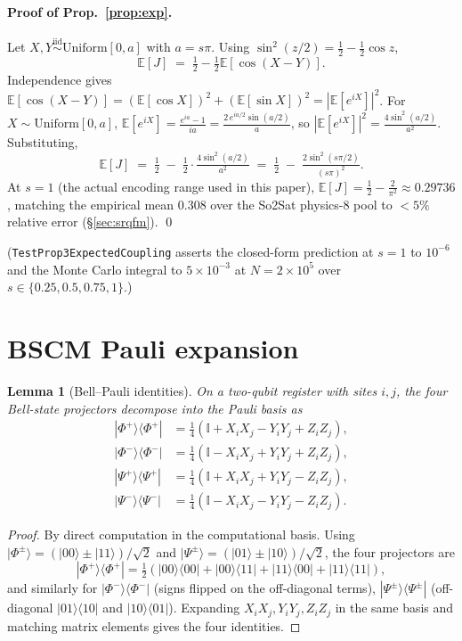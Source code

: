 \documentclass[pdflatex,sn-mathphys]{sn-jnl}
\theoremstyle{plain}
\newtheorem{lemma}{Lemma}
\theoremstyle{remark}
\theoremstyle{definition}
\begin{document}
\paragraph{Proof of Prop.~\ref{prop:exp}.}
Let $X, Y \stackrel{\mathrm{iid}}{\sim} \mathrm{Uniform}[0, a]$ with $a = s\pi$. Using $\sin^2(z/2) = \tfrac12 - \tfrac12\cos z$,
\[
\mathbb{E}[J] \;=\; \tfrac12 - \tfrac12 \mathbb{E}[\cos(X - Y)].
\]
Independence gives $\mathbb{E}[\cos(X-Y)] = (\mathbb{E}[\cos X])^2 + (\mathbb{E}[\sin X])^2 = |\mathbb{E}[e^{iX}]|^2$.
For $X \sim \mathrm{Uniform}[0,a]$, $\mathbb{E}[e^{iX}] = \tfrac{e^{ia} - 1}{ia} = \tfrac{2\,e^{ia/2}\sin(a/2)}{a}$, so $|\mathbb{E}[e^{iX}]|^2 = \tfrac{4\sin^2(a/2)}{a^2}$.
Substituting,
\[
\mathbb{E}[J]
\;=\; \tfrac12 \;-\; \tfrac12 \cdot \tfrac{4\sin^2(a/2)}{a^2}
\;=\; \tfrac12 \;-\; \tfrac{2\sin^2(s\pi/2)}{(s\pi)^2}.
\]
At $s = 1$ (the actual encoding range used in this paper), $\mathbb{E}[J] = \tfrac12 - \tfrac{2}{\pi^2} \approx 0.29736$, matching the empirical mean $0.308$ over the So2Sat physics-8 pool to $<5\%$ relative error (\S\ref{sec:srqfm}). \qed

\noindent (\texttt{TestProp3ExpectedCoupling} asserts the closed-form prediction at $s=1$ to $10^{-6}$ and the Monte Carlo integral to $5\times 10^{-3}$ at $N=2\times 10^{5}$ over $s\in\{0.25,0.5,0.75,1\}$.)

\section{BSCM Pauli expansion}\label{appx:bscm}

\begin{lemma}[Bell--Pauli identities]\label{lem:bell-pauli}
On a two-qubit register with sites $i,j$, the four Bell-state projectors decompose into the Pauli basis as
\begin{align*}
|\Phi^+\rangle\!\langle\Phi^+| &= \tfrac14(\mathbb{I} + X_iX_j - Y_iY_j + Z_iZ_j),\\
|\Phi^-\rangle\!\langle\Phi^-| &= \tfrac14(\mathbb{I} - X_iX_j + Y_iY_j + Z_iZ_j),\\
|\Psi^+\rangle\!\langle\Psi^+| &= \tfrac14(\mathbb{I} + X_iX_j + Y_iY_j - Z_iZ_j),\\
|\Psi^-\rangle\!\langle\Psi^-| &= \tfrac14(\mathbb{I} - X_iX_j - Y_iY_j - Z_iZ_j).
\end{align*}
\end{lemma}
\begin{proof}
By direct computation in the computational basis. Using $|\Phi^\pm\rangle=(|00\rangle\pm|11\rangle)/\sqrt2$ and $|\Psi^\pm\rangle=(|01\rangle\pm|10\rangle)/\sqrt2$, the four projectors are
\[
|\Phi^+\rangle\!\langle\Phi^+| =
\tfrac12\!\left(|00\rangle\!\langle 00|+|00\rangle\!\langle 11|+|11\rangle\!\langle 00|+|11\rangle\!\langle 11|\right),
\]
and similarly for $|\Phi^-\rangle\!\langle\Phi^-|$ (signs flipped on the off-diagonal terms), $|\Psi^\pm\rangle\!\langle\Psi^\pm|$ (off-diagonal $|01\rangle\!\langle 10|$ and $|10\rangle\!\langle 01|$). Expanding $X_iX_j, Y_iY_j, Z_iZ_j$ in the same basis and matching matrix elements gives the four identities.
\end{proof}
\end{document}
